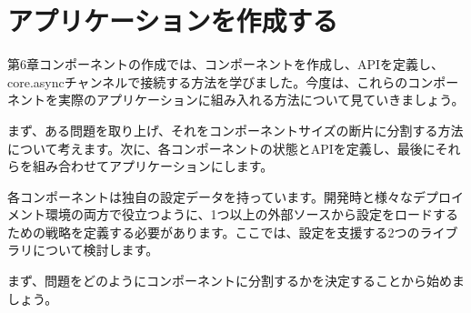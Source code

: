 \chapter{アプリケーションを作成する}

第6章コンポーネントの作成では、コンポーネントを作成し、APIを定義し、core.asyncチャンネルで接続する方法を学びました。今度は、これらのコンポーネントを実際のアプリケーションに組み入れる方法について見ていきましょう。

まず、ある問題を取り上げ、それをコンポーネントサイズの断片に分割する方法について考えます。次に、各コンポーネントの状態とAPIを定義し、最後にそれらを組み合わせてアプリケーションにします。

各コンポーネントは独自の設定データを持っています。開発時と様々なデプロイメント環境の両方で役立つように、1つ以上の外部ソースから設定をロードするための戦略を定義する必要があります。ここでは、設定を支援する2つのライブラリについて検討します。

まず、問題をどのようにコンポーネントに分割するかを決定することから始めましょう。


